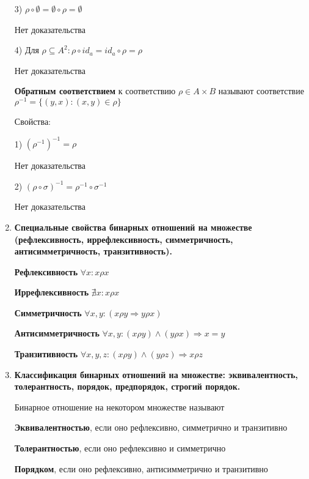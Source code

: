 \documentclass[]{article}
\begin{document}
\begin{enumerate}
3) $\rho \circ \emptyset = \emptyset \circ \rho = \emptyset$

{\color{red} Нет доказательства}

4) Для $\rho \subseteq A^2: \rho \circ id_a = id_a \circ \rho = \rho $




{\color{red} Нет доказательства}

\textbf{Обратным соответствием} к соответствию $\rho \in A \times B$ называют соответствие
$\rho^{-1} = \{(y,x): (x,y) \in \rho\} $

Свойства:

1)  $(\rho^{-1})^{-1} = \rho$

{\color{red} Нет доказательства}

2) $(\rho \circ \sigma)^{-1} = \rho^{-1} \circ \sigma^{-1}$


{\color{red} Нет доказательства}


\hrulefill
\item %
\textbf{Специальные свойства бинарных отношений на множестве (рефлексивность, иррефлексивность, симметричность, антисимметричность, транзитивность).}

\hrulefill

\textbf{Рефлексивность} $\forall x : x\rho x$

\textbf{Иррефлексивность} $\nexists x:  x\rho x $

\textbf{Симметричность} $\forall x,y : (x \rho y \Rightarrow y \rho x) $

\textbf{Антисимметричность} $\forall x,y : (x\rho y) \land (y \rho x) \Rightarrow x = y $

\textbf{Транзитивность} $\forall x,y,z : (x\rho y) \land (y \rho z) \Rightarrow x\rho z $

\hrulefill


\item %
\textbf{Классификация бинарных отношений на множестве: эквивалентность, толерантность, порядок, предпорядок, строгий порядок.}

\hrulefill

Бинарное отношение на некотором множестве называют 

\textbf{Эквивалентностью}, если оно рефлексивно, симметрично и транзитивно

\textbf{Толерантностью}, если оно рефлексивно и симметрично

\textbf{Порядком}, если оно рефлексивно, антисимметрично и транзитивно


\end{enumerate}
\end{document}
